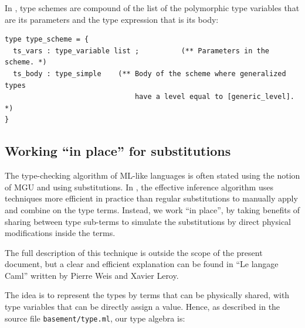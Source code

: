 \medskip
In \focalize, type schemes are compound of the list of the polymorphic
type variables that are its parameters and the type expression that is
its body:
{\footnotesize
\begin{lstlisting}[language=MyOCaml, title=An ``expression'' AST node]
type type_scheme = {
  ts_vars : type_variable list ;          (** Parameters in the scheme. *)
  ts_body : type_simple    (** Body of the scheme where generalized types
                               have a level equal to [generic_level]. *)
}
\end{lstlisting}
}



\subsection{Working ``in place'' for substitutions}
The type-checking algorithm of ML-like languages is often stated using
the notion of MGU and using substitutions. In \focalize, the effective
inference algorithm uses techniques more efficient in practice than
regular substitutions to manually apply and combine on the type
terms. Instead, we work ``in place'', by taking benefits of sharing
between type sub-terms to simulate the substitutions by direct
physical modifications inside the terms.

\medskip
The full description of this technique is outside the scope of the
present document, but a clear and efficient explanation can be found
in ``Le langage Caml'' written by Pierre Weis and Xavier Leroy.

\medskip
The idea is to represent the types by terms that can be physically
shared, with type variables that can be directly assign a
value. Hence, as described in the source file {\tt basement/type.ml},
our type algebra is:

